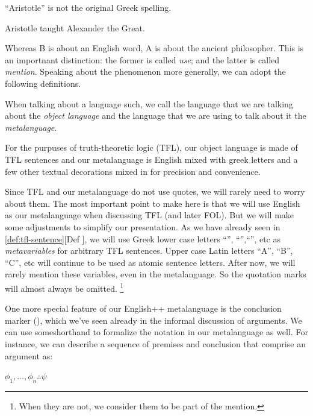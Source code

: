 \begin{argument}
\item[A:] ``Aristotle'' is not the original Greek spelling.  
\item[B:] Aristotle taught Alexander the Great.
\end{argument}

Whereas B is about an English word, A is about the ancient philosopher. This is
an importnant distinction: the former is called \emph{use}; and the latter is
called \emph{mention}. Speaking about the phenomenon more generally, we can
adopt the following definitions.

\begin{definition}
  When talking about a language such, we call the language that we are talking
  about the \emph{object language} and the language that we are using to talk
  about it the \emph{metalanguage}. 
\end{definition}

For the purpuses of truth-theoretic logic (TFL), our object language is made of
TFL sentences and our metalanguage is English mixed with greek letters and a few
other textual decorations mixed in for precision and convenience.

Since TFL and our metalanguage do not use quotes, we will rarely need to worry
about them. The most important point to make here is that we will use English
as our metalanguage when discussing TFL (and later FOL). But we will make some
adjustments to simplify our presentation. As we have already seen in
\ref{def:tfl-sentence}[Def ], we will use Greek lower case letters ``\ephi'',
``\epsi'',``\echi'', etc as \emph{metavariables} for arbitrary TFL sentences.
Upper case Latin letters ``A'', ``B'', ``C'', etc will continue to be used as
atomic sentence letters. After now, we will rarely mention these variables,
even in the metalanguage. So the quotation marks will almost always be omitted.
\footnote{When they are not, we consider them to be part of the mention.}

One more special feature of our English++ metalanguage is the conclusion marker
(\therefore), which we've seen already in the informal discussion of arguments.
We can use someshorthand to formalize the notation in our metalanguage as well.
For instance, we can describe a sequence of premises and conclusion that
comprise an argument as:

\begin{definition}
  \begin{argument}
  \item[ ] $\phi_1,\dots,\phi_n  \therefore  \psi$
  \end{argument}
\end{definition}

